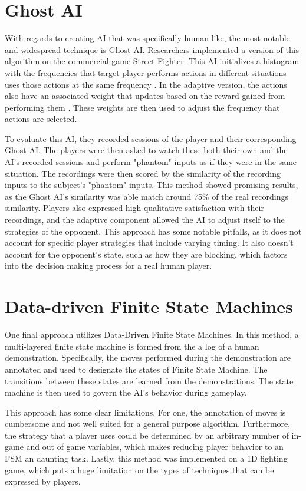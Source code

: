 \section{Ghost AI}
With regards to creating AI that was specifically human-like, the most notable and widespread technique is Ghost AI. Researchers implemented a version of this algorithm on the commercial game Street Fighter. This AI initializes a histogram with the frequencies that target player performs actions in different situations uses those actions at the same frequency \parencite{GhostAI}. In the adaptive version, the actions also have an associated weight that updates based on the reward gained from performing them \parencite{GhostAI2}. These weights are then used to adjust the frequency that actions are selected.

To evaluate this AI, they recorded sessions of the player and their corresponding Ghost AI. The players were then asked to watch these both their own and the AI's recorded sessions and perform "phantom" inputs as if they were in the same situation. The recordings were then scored by the similarity of the recording inputs to the subject's "phantom" inputs. This method showed promising results, as the Ghost AI's similarity was able match around 75\% of the real recordings similarity. Players also expressed high qualitative satisfaction with their recordings, and the adaptive component allowed the AI to adjust itself to the strategies of the opponent. This approach has some notable pitfalls, as it does not account for specific player strategies that include varying timing. It also doesn't account for the opponent's state, such as how they are blocking, which factors into the decision making process for a real human player. 

\section{Data-driven Finite State Machines}
One final approach utilizes Data-Driven Finite State Machines. In this method, a multi-layered finite state machine is formed from the a log of a human demonstration. Specifically, the moves performed during the demonstration are annotated and used to designate the states of Finite State Machine. The transitions between these states are learned from the demonstrations. The state machine is then used to govern the AI's behavior during gameplay.

This approach has some clear limitations. For one, the annotation of moves is cumbersome and not well suited for a general purpose algorithm. Furthermore, the strategy that a player uses could be determined by an arbitrary number of in-game and out of game variables, which makes reducing player behavior to an FSM an daunting task. Lastly, this method was implemented on a 1D fighting game, which puts a huge limitation on the types of techniques that can be expressed by players.

